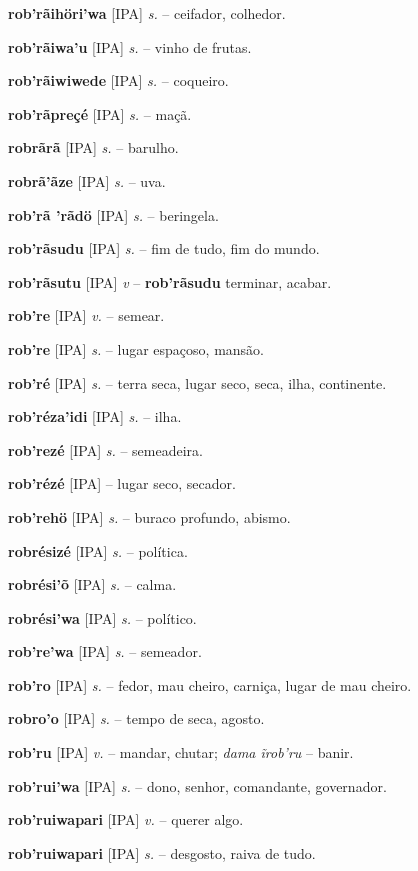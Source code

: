 \textbf{rob'rãihöri'wa} [IPA] \textit{s.} -- ceifador, colhedor.

\textbf{rob'rãiwa'u} [IPA] \textit{s.} -- vinho de frutas.

\textbf{rob'rãiwiwede} [IPA] \textit{s.} -- coqueiro.

\textbf{rob'rãpreçé} [IPA] \textit{s.} -- maçã.

\textbf{robrãrã} [IPA] \textit{s.} -- barulho.

\textbf{robrã'ãze} [IPA] \textit{s.} -- uva.

\textbf{rob'rã 'rãdö} [IPA] \textit{s.} -- beringela.

\textbf{rob'rãsudu} [IPA] \textit{s.} -- fim de tudo, fim do mundo.

\textbf{rob'rãsutu} [IPA] \textit{v} -- \textbf{rob'rãsudu} terminar, acabar.

\textbf{rob're} [IPA] \textit{v.} -- semear.

\textbf{rob're} [IPA] \textit{s.} -- lugar espaçoso, mansão.

\textbf{rob'ré} [IPA] \textit{s.} -- terra seca, lugar seco, seca, ilha, continente.

\textbf{rob'réza'idi} [IPA] \textit{s.} -- ilha.

\textbf{rob'rezé} [IPA] \textit{s.} -- semeadeira.

\textbf{rob'rézé} [IPA] \textit{} -- lugar seco, secador.

\textbf{rob'rehö} [IPA] \textit{s.} -- buraco profundo, abismo.

\textbf{robrésizé} [IPA] \textit{s.} -- política.

\textbf{robrési'õ} [IPA] \textit{s.} -- calma.

\textbf{robrési'wa} [IPA] \textit{s.} -- político.

\textbf{rob're'wa} [IPA] \textit{s.} -- semeador.

\textbf{rob'ro} [IPA] \textit{s.} -- fedor, mau cheiro, carniça, lugar de mau cheiro.

\textbf{robro'o} [IPA] \textit{s.} -- tempo de seca, agosto.

\textbf{rob'ru} [IPA] \textit{v.} -- mandar, chutar; \textit{dama ĩrob'ru} -- banir.

\textbf{rob'rui'wa} [IPA] \textit{s.} -- dono, senhor, comandante, governador.

\textbf{rob'ruiwapari} [IPA] \textit{v.} -- querer algo.

\textbf{rob'ruiwapari} [IPA] \textit{s.} -- desgosto, raiva de tudo.

